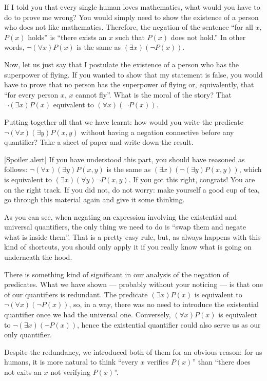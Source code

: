 \begin{para}
If I told you that every single human loves mathematics, what would you have to do to prove me wrong?
You would simply need to show the existence of a person who does not like mathematics.
Therefore, the negation of the sentence ``for all $x$, $P(x)$ holds'' is ``there exists an $x$ such that $P(x)$ does not hold.''
In other words, $\lnot (\forall x) P(x)$ is the same as $(\exists x)(\lnot P(x))$.

Now, let us just say that I postulate the existence of a person who has the superpower of flying.
If you wanted to show that my statement is false, you would have to prove that no person has the superpower of flying or, equivalently, that ``for every person $x$, $x$ cannot fly''.
What is the moral of the story? That $\lnot(\exists x)P(x)$ equivalent to $(\forall x)(\lnot P(x))$.

Putting together all that we have learnt: how would you write the predicate $\lnot(\forall x)(\exists y)P(x,y)$ without having a negation connective before any quantifier?
Take a sheet of paper and write down the result.

[Spoiler alert]
If you have understood this part, you should have reasoned as follows: $\lnot(\forall x)(\exists y) P(x,y)$ is the same as $(\exists x)(\lnot (\exists y) P(x,y))$, which is equivalent to $(\exists x)(\forall y) \lnot P(x,y)$. If you got this right, congrats! You are on the right track.
If you did not, do not worry: make yourself a good cup of tea, go through this material again and give it some thinking.

As you can see, when negating an expression involving the existential and universal quantifiers, the only thing we need to do is ``swap them and negate what is inside them''.
That is a pretty easy rule, but, as always happens with this kind of shortcuts, you should only apply it if you really know what is going on underneath the hood.
\end{para}


\begin{para}
There is something kind of significant in our analysis of the negation of predicates. What we have shown --- probably without your noticing --- is that one of our quantifiers is redundant. The predicate $(\exists x) P(x)$ is equivalent to $\lnot (\forall x)(\lnot P(x))$, so, in a way, there was no need to introduce the existential quantifier once we had the universal one. Conversely, $(\forall x) P(x)$ is equivalent to $\lnot(\exists x)(\lnot P(x))$, hence the existential quantifier could also serve us as our only quantifier.

Despite the redundancy, we introduced both of them for an obvious reason:
for us humans, it is more natural to think ``every $x$ verifies $P(x)$'' than ``there does not exits an $x$ not verifying $P(x)$''.
\end{para}

